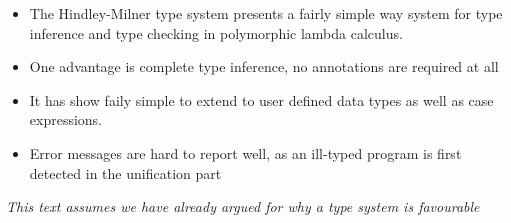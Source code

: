 \begin{itemize}
    \item The Hindley-Milner type system presents a fairly simple way system for type inference and type checking in polymorphic lambda calculus.
    \item One advantage is complete type inference, no annotations are required at all
    \item It has show faily simple to extend to user defined data types as well as case expressions.
    \item Error messages are hard to report well, as an ill-typed program is first detected in the unification part
\end{itemize}

\emph{This text assumes we have already argued for why a type system is favourable}

